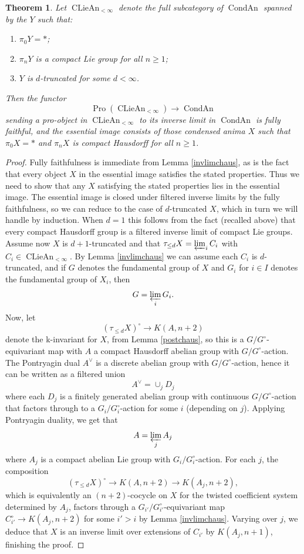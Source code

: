 \documentclass[12pt]{article}
\newtheorem{theorem}{Theorem}[section]
\theoremstyle{definition}
\newcommand{\on}{\operatorname}
\begin{document}
\begin{theorem}\label{proclie}
Let $\on{CLieAn}_{<\infty}$ denote the full subcategory of $\on{CondAn}$ spanned by the $Y$ such that:
\begin{enumerate}
\item $\pi_0Y=\ast$;
\item $\pi_nY$ is a compact Lie group for all $n\geq 1$;
\item $Y$ is $d$-truncated for some $d<\infty$.
\end{enumerate}
Then the functor
$$\on{Pro}(\on{CLieAn}_{<\infty})\to \on{CondAn}$$
sending a pro-object in $\on{CLieAn}_{<\infty}$ to its inverse limit in $\on{CondAn}$ is fully faithful, and the essential image consists of those condensed anima $X$ such that $\pi_0X=\ast$ and $\pi_nX$ is compact Hausdorff for all $n\geq 1$.
\end{theorem}
\begin{proof}
Fully faithfulness is immediate from Lemma \ref{invlimchaus}, as is the fact that every object $X$ in the essential image satisfies the stated properties.  Thus we need to show that any $X$ satisfying the stated properties lies in the essential image.  The essential image is closed under filtered inverse limits by the fully faithfulness, so we can reduce to the case of $d$-truncated $X$, which in turn we will handle by induction.  When $d=1$ this follows from the fact (recalled above) that every compact Hausdorff group is a filtered inverse limit of compact Lie groups.  Assume now $X$ is $d+1$-truncated and that $\tau_{\leq d}X = \varprojlim_i C_i$ with $C_i\in \on{CLieAn}_{<\infty}$.  By Lemma \ref{invlimchaus} we can assume each $C_i$ is $d$-truncated, and if $G$ denotes the fundamental group of $X$ and $G_i$ for $i\in I$ denotes the fundamental group of $X_i$, then
$$G = \varprojlim_i G_i.$$
Now, let
$$(\tau_{\leq d}X)^\circ \to K(A,n+2)$$
denote the k-invariant for $X$, from Lemma \ref{postchaus}, so this is a $G/G^\circ$-equivariant map with $A$ a compact Hausdorff abelian group with $G/G^\circ$-action.  The Pontryagin dual $A^\vee$ is a discrete abelian group with $G/G^\circ$-action, hence it can be written as a filtered union
$$A^\vee = \cup_j D_j$$
where each $D_j$ is a finitely generated abelian group with continuous $G/G^\circ$-action that factors through to a $G_i/G_i^\circ$-action for some $i$ (depending on $j$).  Applying Pontryagin duality, we get that
$$A = \varprojlim_j A_j$$
where $A_j$ is a compact abelian Lie group with $G_i/G_i^\circ$-action.  For each $j$, the composition
$$(\tau_{\leq d}X)^\circ \to K(A,n+2) \to K(A_j,n+2),$$
which is equivalently an $(n+2)$-cocycle on $X$ for the twisted coefficient system determined by $A_j$, factors through a $G_{i'}/G_{i'}^\circ$-equivariant map $C_{i'}^\circ \to K(A_j,n+2)$ for some $i'>i$ by Lemma \ref{invlimchaus}.  Varying over $j$, we deduce that $X$ is an inverse limit over extensions of $C_{i'}$ by $K(A_j,n+1)$, finishing the proof.
\end{proof}
\end{document}
